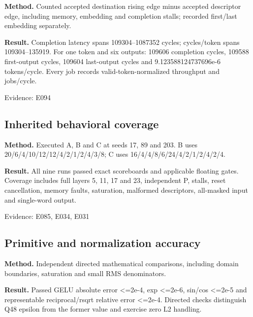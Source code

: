 \documentclass[11pt,a4paper]{article}
\begin{document}
\textbf{Method.} Counted accepted destination rising edge minus accepted descriptor edge,\allowbreak{} including memory,\allowbreak{} embedding and completion stalls; recorded first/\allowbreak{}last embedding separately.

\textbf{Result.} Completion latency spans 109304–1087352 cycles; cycles/\allowbreak{}token spans 109304–135919. For one token and six outputs: 109606 completion cycles,\allowbreak{} 109588 first-output cycles,\allowbreak{} 109604 last-output cycles and 9.123588124737696e-6 tokens/\allowbreak{}cycle. Every job records valid-token-normalized throughput and jobs/\allowbreak{}cycle.

{\small Evidence: E094}

\subsection{Inherited behavioral coverage}

\textbf{Method.} Executed A,\allowbreak{} B and C at seeds 17,\allowbreak{} 89 and 203. B uses 20/\allowbreak{}6/\allowbreak{}4/\allowbreak{}10/\allowbreak{}12/\allowbreak{}12/\allowbreak{}4/\allowbreak{}2/\allowbreak{}1/\allowbreak{}2/\allowbreak{}4/\allowbreak{}3/\allowbreak{}8; C uses 16/\allowbreak{}4/\allowbreak{}4/\allowbreak{}8/\allowbreak{}6/\allowbreak{}24/\allowbreak{}4/\allowbreak{}2/\allowbreak{}1/\allowbreak{}2/\allowbreak{}4/\allowbreak{}2/\allowbreak{}4.

\textbf{Result.} All nine runs passed exact scoreboards and applicable floating gates. Coverage includes full layers 5,\allowbreak{} 11,\allowbreak{} 17 and 23,\allowbreak{} independent P,\allowbreak{} stalls,\allowbreak{} reset cancellation,\allowbreak{} memory faults,\allowbreak{} saturation,\allowbreak{} malformed descriptors,\allowbreak{} all-masked input and single-word output.

{\small Evidence: E085,\allowbreak{} E034,\allowbreak{} E031}

\subsection{Primitive and normalization accuracy}

\textbf{Method.} Independent directed mathematical comparisons,\allowbreak{} including domain boundaries,\allowbreak{} saturation and small RMS denominators.

\textbf{Result.} Passed GELU absolute error <=\allowbreak{}2e-4,\allowbreak{} exp <=\allowbreak{}2e-6,\allowbreak{} sin/\allowbreak{}cos <=\allowbreak{}2e-5 and representable reciprocal/\allowbreak{}rsqrt relative error <=\allowbreak{}2e-4. Directed checks distinguish Q48 epsilon from the former value and exercise zero L2 handling.
\end{document}
